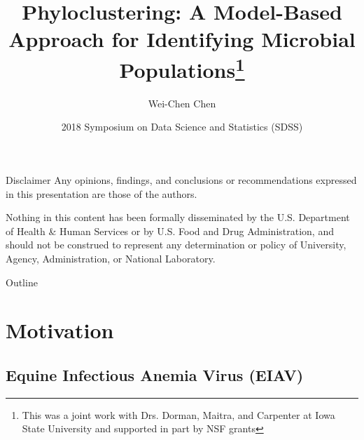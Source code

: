 \documentclass{beamer}
\title[Phyloclustering]{Phyloclustering: A Model-Based Approach for Identifying Microbial Populations\footnote{
\tiny
This was a joint work with Drs. Dorman, Maitra, and Carpenter at Iowa State
University and supported in part by NSF grants}}
\author{\large Wei-Chen Chen}
\institute{\normalsize \pbdR Core Team}
\date{\small 2018 Symposium on Data Science and Statistics (SDSS)}
\begin{document}
\begin{frame}
  \titlepage
\end{frame}

\begin{frame}{Disclaimer}
Any opinions, findings, and conclusions or recommendations expressed in
this presentation are those of the authors.

\vspace{\baselineskip}

Nothing in this content has been formally disseminated by the U.S. Department
of Health \& Human Services or by U.S. Food and Drug Administration,
and should not be construed to represent any determination
or policy of University, Agency, Administration, or National Laboratory.
\end{frame}


\begin{frame}{Outline}
  \tableofcontents
\end{frame}


\section{Motivation}
\subsection{Equine Infectious Anemia Virus (EIAV)}
\end{document}
